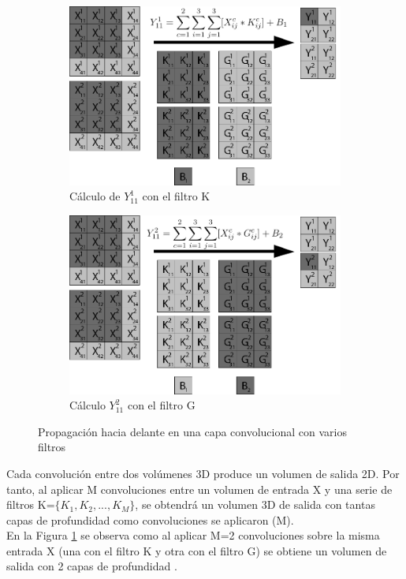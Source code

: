 \begin{figure}[H]
	\centering
	\begin{subfigure}{.5\textwidth}
		\hspace{-10mm}
		\includegraphics[width=1.2\linewidth]{imagenes/conv_2kernels_1.jpg}  
		\caption{Cálculo de $Y^1_{11}$ con el filtro K}
	\end{subfigure}%
	\begin{subfigure}{.5\textwidth}
		\hspace{10mm}
		\includegraphics[width=1.2\linewidth]{imagenes/conv_2kernels_2.jpg}  
		\caption{Cálculo $Y^2_{11}$ con el filtro G}
	\end{subfigure}
	\caption{Propagación hacia delante en una capa convolucional con varios filtros}
	\label{fig:forward_prop_convolucional_varios_kernels}
\end{figure}

Cada convolución entre dos volúmenes 3D produce un volumen de salida 2D. Por tanto, al aplicar M convoluciones entre un volumen de entrada X y una serie de filtros K=$\{K_1, K_2, ..., K_M\}$, se obtendrá un volumen 3D de salida con tantas capas de profundidad como convoluciones se aplicaron (M). \\
En la Figura \ref{fig:forward_prop_convolucional_varios_kernels} se observa como al aplicar M=2 convoluciones sobre la misma entrada X (una con el filtro K y otra con el filtro G) se obtiene un volumen de salida con 2 capas de profundidad \cite{capa_convolucional_Stanford}.

